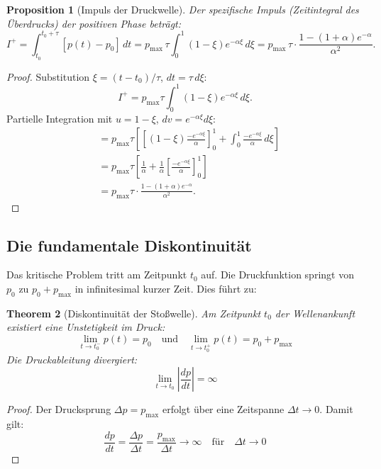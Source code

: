 ﻿\documentclass[12pt,a4paper]{article}
\newtheorem{theorem}{Theorem}[section]
\newtheorem{proposition}[theorem]{Proposition}
\theoremstyle{definition}
\theoremstyle{remark}
\begin{document}
\begin{proposition}[Impuls der Druckwelle]
\label{prop:impuls}
Der spezifische Impuls (Zeitintegral des Über\-drucks) der positiven Phase beträgt:
\begin{equation}
I^+ = \int_{t_0}^{t_0+\tau} [p(t)-p_0]\,dt = p_{\text{max}}\,\tau \int_0^1 (1-\xi)e^{-\alpha\xi}\,d\xi = p_{\text{max}}\,\tau \cdot \frac{1 - (1+\alpha)e^{-\alpha}}{\alpha^2}.
\end{equation}
\end{proposition}
\begin{proof}
Substitution $\xi = (t-t_0)/\tau$, $dt = \tau\,d\xi$:
\[
I^+ = p_{\text{max}}\tau\int_0^1(1-\xi)e^{-\alpha\xi}\,d\xi.
\]
Partielle Integration mit $u = 1-\xi$, $dv = e^{-\alpha\xi}d\xi$:
\begin{align*}
	&= p_{\text{max}}\tau\left[\left[(1-\xi)\frac{-e^{-\alpha\xi}}{\alpha}\right]_0^1 + \int_0^1 \frac{-e^{-\alpha\xi}}{\alpha}\,d\xi\right] \\
	&= p_{\text{max}}\tau\left[\frac{1}{\alpha} + \frac{1}{\alpha}\left[\frac{-e^{-\alpha\xi}}{\alpha}\right]_0^1\right] \\
	&= p_{\text{max}}\tau\cdot\frac{1-(1+\alpha)e^{-\alpha}}{\alpha^2}. 	
\end{align*}
\end{proof}

\subsection{Die fundamentale Diskontinuität}

Das kritische Problem tritt am Zeitpunkt $t_0$ auf. Die Druckfunktion springt von $p_0$ zu $p_0 + p_{\text{max}}$ in infinitesimal kurzer Zeit. Dies führt zu:

\begin{theorem}[Diskontinuität der Stoßwelle]
Am Zeitpunkt $t_0$ der Wellenankunft existiert eine Unstetigkeit im Druck:
\begin{equation}
\lim_{t \to t_0^-} p(t) = p_0 \quad \text{und} \quad \lim_{t \to t_0^+} p(t) = p_0 + p_{\text{max}}
\end{equation}
Die Druckableitung divergiert:
\begin{equation}
\lim_{t \to t_0} \left|\frac{dp}{dt}\right| = \infty
\end{equation}
\end{theorem}

\begin{proof}
Der Drucksprung $\Delta p = p_{\text{max}}$ erfolgt über eine Zeitspanne $\Delta t \to 0$. Damit gilt:
\[
\frac{dp}{dt} = \frac{\Delta p}{\Delta t} = \frac{p_{\text{max}}}{\Delta t} \to \infty \quad \text{für} \quad \Delta t \to 0
\]
\end{proof}
\end{document}
